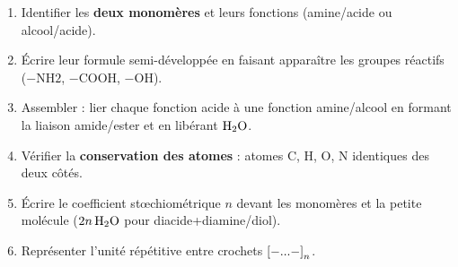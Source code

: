 \documentclass[11pt]{article}
\begin{document}
\begin{methode}
\begin{enumerate}
  \item Identifier les \textbf{deux monomères} et leurs fonctions (amine/acide ou alcool/acide).
  \item Écrire leur formule semi-développée en faisant apparaître les groupes réactifs ($-\mathrm{NH2}$, $-\mathrm{COOH}$, $-\mathrm{OH}$).
  \item Assembler : lier chaque fonction acide à une fonction amine/alcool en formant la liaison amide/ester et en libérant $\ce{H2O}$.
  \item Vérifier la \textbf{conservation des atomes} : atomes C, H, O, N identiques des deux côtés.
  \item Écrire le coefficient stœchiométrique $n$ devant les monomères et la petite molécule ($2n\,\ce{H2O}$ pour diacide+diamine/diol).
  \item Représenter l'unité répétitive entre crochets $\ce{[-...-]}_n$.
\end{enumerate}
\end{methode}
\end{document}

